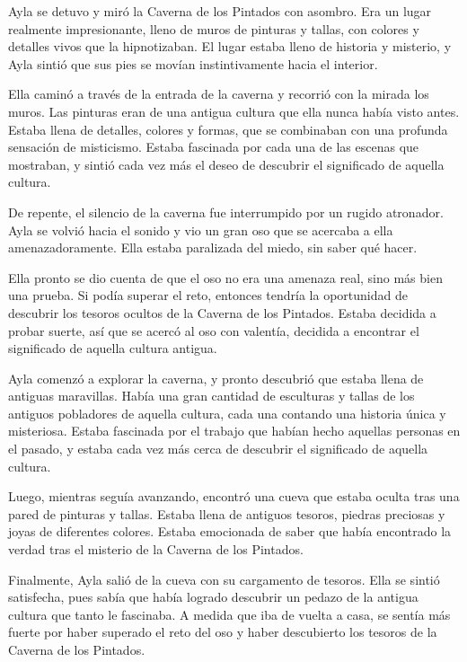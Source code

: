

Ayla se detuvo y miró la Caverna de los Pintados con asombro. Era un lugar realmente impresionante, lleno de muros de pinturas y tallas, con colores y detalles vivos que la hipnotizaban. El lugar estaba lleno de historia y misterio, y Ayla sintió que sus pies se movían instintivamente hacia el interior.

Ella caminó a través de la entrada de la caverna y recorrió con la mirada los muros. Las pinturas eran de una antigua cultura que ella nunca había visto antes. Estaba llena de detalles, colores y formas, que se combinaban con una profunda sensación de misticismo. Estaba fascinada por cada una de las escenas que mostraban, y sintió cada vez más el deseo de descubrir el significado de aquella cultura.

De repente, el silencio de la caverna fue interrumpido por un rugido atronador. Ayla se volvió hacia el sonido y vio un gran oso que se acercaba a ella amenazadoramente. Ella estaba paralizada del miedo, sin saber qué hacer.

Ella pronto se dio cuenta de que el oso no era una amenaza real, sino más bien una prueba. Si podía superar el reto, entonces tendría la oportunidad de descubrir los tesoros ocultos de la Caverna de los Pintados. Estaba decidida a probar suerte, así que se acercó al oso con valentía, decidida a encontrar el significado de aquella cultura antigua.

Ayla comenzó a explorar la caverna, y pronto descubrió que estaba llena de antiguas maravillas. Había una gran cantidad de esculturas y tallas de los antiguos pobladores de aquella cultura, cada una contando una historia única y misteriosa. Estaba fascinada por el trabajo que habían hecho aquellas personas en el pasado, y estaba cada vez más cerca de descubrir el significado de aquella cultura.

Luego, mientras seguía avanzando, encontró una cueva que estaba oculta tras una pared de pinturas y tallas. Estaba llena de antiguos tesoros, piedras preciosas y joyas de diferentes colores. Estaba emocionada de saber que había encontrado la verdad tras el misterio de la Caverna de los Pintados.

Finalmente, Ayla salió de la cueva con su cargamento de tesoros. Ella se sintió satisfecha, pues sabía que había logrado descubrir un pedazo de la antigua cultura que tanto le fascinaba. A medida que iba de vuelta a casa, se sentía más fuerte por haber superado el reto del oso y haber descubierto los tesoros de la Caverna de los Pintados.